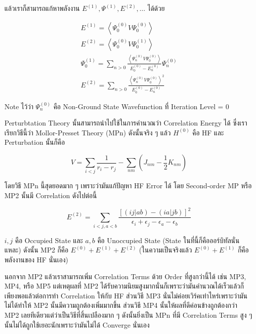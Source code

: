 แล้วเราก็สามารถแก้หาพลังงาน $E^{(1)}, \Psi^{(1)}, E^{(2)}, \dots$ ได้ด้วย

\begin{gather}
    E^{(1)} = \left\langle\Psi_0^{(0)} V \Psi_0^{(0)}\right\rangle \\
    E^{(2)} = \left\langle\Psi_0^{(0)} V \Psi_0^{(1)}\right\rangle \\
    \Psi_0^{(1)} = \sum_{n>0} \frac{\left\langle\Psi_n^{(0)} V \Psi_0^{(0)}\right\rangle}
    {E_0^{(0)}-E_n^{(0)}} \Psi_n^{(0)} \\
    E^{(2)} = \sum_{n>0} \frac{\left\langle\Psi_n^{(0)} V \Psi_0^{(0)}\right\rangle^2}
    {E_0^{(0)}-E_n^{(0)}}
\end{gather}

Note ไว้ว่า $\Psi^{(0)}_{n}$ คือ Non-Ground State Wavefunction ที่ Iteration Level = 0

Perturbtation Theory นั้นสามารถนำไปใช้ในการคำนวณว่า Correlation Energy ได้ ซึ่งเราเรียกวิธีนี้ว่า
Mollor-Presset Theory (MPn) ดังนั้นจริง ๆ แล้ว $H^{(0)}$ คือ HF และ Perturbation นั้นก็คือ

\begin{equation}
    V = \sum_{i < j} \frac{1}{r_{i} - r_{j}} - \sum_{nm} (J_{nm} - \frac{1}{2}K_{nm})
\end{equation}

โดยวิธี MPn นี้สุดยอดมาก ๆ เพราะว่ามันแก้ปัญหา HF Error ได้ โดย Second-order MP หรือ MP2 นั้นมี
Correlation ดังไปต่อนี้

\begin{equation}
    E^{(2)} = \sum_{i<j,a<b} \frac{[(ij|ab) - (ia|jb)]^{2}}
    {\epsilon_{i} + \epsilon_{j} - \epsilon_{a} - \epsilon_{b}}
\end{equation}

\noindent $i,j$ คือ Occupied State และ $a,b$ คือ Unoccupied State (State ในที่นี้ก็คือออร์บิทัลนั่นแหละ)
ดังนั้น MP2 ก็คือ $E^{(0)} + E^{(1)} + E^{(2)}$ (ในความเป็นจริงแล้ว $E^{(0)} + E^{(1)}$ ก็คือพลังงานของ
HF นั่นเอง)

นอกจาก MP2 แล้วเราสามารถเพิ่ม Correlation Terms ด้วย Order ที่สูงกว่านี้ได้ เช่น MP3, MP4, หรือ MP5
แต่เหตุผลที่ MP2 ได้รับความนิยมสูงมากนั่นก็เพราะว่ามันคำนวณได้เร็วแล้วก็เพียงพอแล้วต่อการทำ Correlation
ให้กับ HF ส่วนวิธี MP3 นั่นไม่ค่อยเวิร์คเท่าไหร่เพราะว่ามันไม่ได้ทำให้ MP2 นั้นมีความถูกต้องเพิ่มมากขึ้น ส่วนวิธี MP4
นั้นให้ผลที่ดีค่อนข้างถูกต้องกว่า MP2 เลยทีเดียวแต่ว่าเป็นวิธีที่สิ้นเปลืองมาก ๆ ดังนั้นยิ่งเป็น MPn ที่มี Correlation Terms
สูง ๆ นั้นไม่ได้ถูกใช้เยอะนักเพราะว่ามันไม่ได้ Converge นั่นเอง

